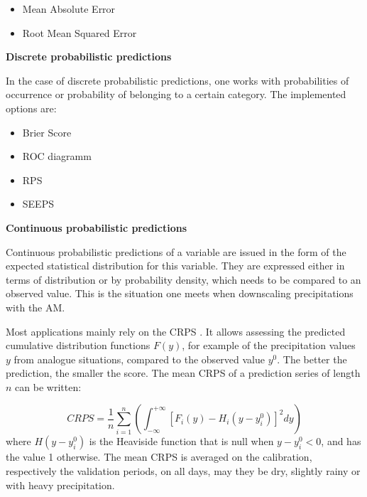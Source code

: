\documentclass[review]{elsarticle}
\begin{document}
\begin{itemize}
	\setlength\itemsep{-1mm}
	\item Mean Absolute Error
	\item Root Mean Squared Error
\end{itemize}


\textbf{Discrete probabilistic predictions}

In the case of discrete probabilistic predictions, one works with probabilities of occurrence or probability of belonging to a certain category. The implemented options are:

\begin{itemize}
	\setlength\itemsep{-1mm}
	\item Brier Score \citep{Brier1950}
	\item ROC diagramm \citep[Relative Operating Characteristic or Receiver Operating Characteristic,][]{Mason1982}
	\item RPS \citep[Ranked Probability Score,][]{Epstein1969}
	\item SEEPS \citep[Stable Equitable Error in Probability Space,][]{Rodwell2010,Rodwell2011}
\end{itemize}


\textbf{Continuous probabilistic predictions}
\label{sec:prob_forecasts}

Continuous probabilistic predictions of a variable are issued in the form of the expected statistical distribution for this variable. They are expressed either in terms of distribution or by probability density, which needs to be compared to an observed value. This is the situation one meets when downscaling precipitations with the AM.

Most applications mainly rely on the CRPS \citep[Continuous Ranked Probability Score,][]{Brown1974, Matheson1976, Hersbach2000}. It allows assessing the predicted cumulative distribution functions $F(y)$, for example of the precipitation values $y$ from analogue situations, compared to the observed value $y^{0}$. The better the prediction, the smaller the score. The mean CRPS of a prediction series of length $n$ can be written:

\begin{equation}
\label{eq:CRPS}
CRPS = \frac{1}{n} \sum_{i=1}^{n} \left(  \int_{-\infty}^{+\infty} \left[ F_{i}(y)-H_{i}(y-y_{i}^{0})\right]^{2} dy \right) 
\end{equation}
where $H(y-y_{i}^{0})$ is the Heaviside function that is null when $y-y_{i}^{0}<0$, and has the value 1 otherwise. The mean CRPS is averaged on the calibration, respectively the validation periods, on all days, may they be dry, slightly rainy or with heavy precipitation.
\end{document}
